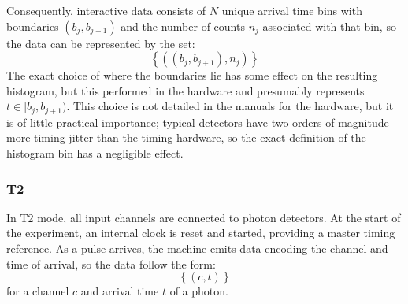\documentclass{article}
\newcommand{\braces}[1]{\ensuremath{\left\lbrace #1 \right\rbrace}}
\newcommand{\angles}[1]{\ensuremath{\left\langle #1 \right\rangle}}
\newcommand{\gn}[1]{\ensuremath{g^{(#1)}}}
\begin{document}
Consequently, interactive data consists of $N$ unique arrival time bins with boundaries $(b_{j}, b_{j+1})$ and the number of counts $n_{j}$ associated with that bin, so the data can be represented by the set:
\begin{equation}
\braces{((b_{j}, b_{j+1}), n_{j})}
\end{equation}
The exact choice of where the boundaries lie has some effect on the resulting histogram, but this performed in the hardware and presumably represents $t\in[b_{j}, b_{j+1})$. This choice is not detailed in the manuals for the hardware, but it is of little practical importance; typical detectors have two orders of magnitude more timing jitter than the timing hardware, so the exact definition of the histogram bin has a negligible effect.

\subsubsection{T2}
In T2 mode, all input channels are connected to photon detectors. At the start of the experiment, an internal clock is reset and started, providing a master timing reference. As a pulse arrives, the machine emits data encoding the channel and time of arrival, so the data follow the form:
\begin{equation}
\braces{(c, t)}
\end{equation}
for a channel $c$ and arrival time $t$ of a photon.
\end{document}
